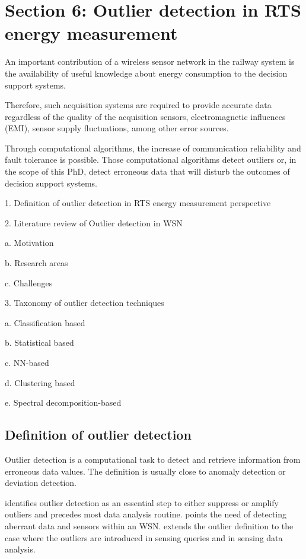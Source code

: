 


\section{Section 6: Outlier detection in RTS energy measurement}
An important contribution of a wireless sensor network in the railway system is the availability of useful knowledge about energy consumption to the decision support systems.

Therefore, such acquisition systems are required to provide accurate data regardless of the quality of the acquisition sensors, electromagnetic influences (EMI), sensor supply fluctuations, among other error sources.

Through computational algorithms, the increase of communication reliability and fault tolerance is possible. Those computational algorithms detect outliers or, in the scope of this PhD, detect erroneous data that will disturb the outcomes of decision support systems. 

1.	Definition of outlier detection in RTS energy measurement perspective

2.	Literature review of Outlier detection in WSN

a.	Motivation

b.	Research areas

c.	Challenges

3.	Taxonomy of outlier detection techniques

a.	Classification based

b.	Statistical based

c.	NN-based

d.	Clustering based

e.	Spectral decomposition-based

\subsection{Definition of outlier detection}

\label{sec:def}
Outlier detection is a computational task to detect and retrieve information from erroneous data values. The definition is usually close to anomaly detection or deviation detection. 

\cite{class:branch:2006} identifies outlier detection as an essential step to either suppress or amplify outliers and precedes most data analysis routine. \cite{nn:abid:2016} points the need of detecting aberrant data and sensors within an WSN. \cite{nn:zhuang:2006} extends the outlier definition to the case where the outliers are introduced in sensing queries and in sensing data analysis.

